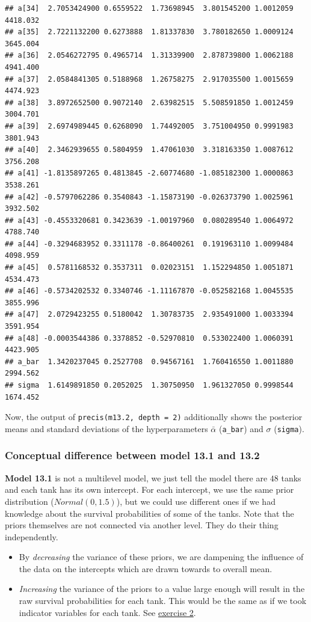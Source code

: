 \documentclass[
]{book}
\begin{document}
\begin{verbatim}
## a[34]  2.7053424900 0.6559522  1.73698945  3.801545200 1.0012059 4418.032
## a[35]  2.7221132200 0.6273888  1.81337830  3.780182650 1.0009124 3645.004
## a[36]  2.0546272795 0.4965714  1.31339900  2.878739800 1.0062188 4941.400
## a[37]  2.0584841305 0.5188968  1.26758275  2.917035500 1.0015659 4474.923
## a[38]  3.8972652500 0.9072140  2.63982515  5.508591850 1.0012459 3004.701
## a[39]  2.6974989445 0.6268090  1.74492005  3.751004950 0.9991983 3801.943
## a[40]  2.3462939655 0.5804959  1.47061030  3.318163350 1.0087612 3756.208
## a[41] -1.8135897265 0.4813845 -2.60774680 -1.085182300 1.0000863 3538.261
## a[42] -0.5797062286 0.3540843 -1.15873190 -0.026373790 1.0025961 3932.502
## a[43] -0.4553320681 0.3423639 -1.00197960  0.080289540 1.0064972 4788.740
## a[44] -0.3294683952 0.3311178 -0.86400261  0.191963110 1.0099484 4098.959
## a[45]  0.5781168532 0.3537311  0.02023151  1.152294850 1.0051871 4534.473
## a[46] -0.5734202532 0.3340746 -1.11167870 -0.052582168 1.0045535 3855.996
## a[47]  2.0729423255 0.5180042  1.30783735  2.935491000 1.0033394 3591.954
## a[48] -0.0003544386 0.3378852 -0.52970810  0.533022400 1.0060391 4423.905
## a_bar  1.3420237045 0.2527708  0.94567161  1.760416550 1.0011880 2994.562
## sigma  1.6149891850 0.2052025  1.30750950  1.961327050 0.9998544 1674.452
\end{verbatim}

Now, the output of \texttt{precis(m13.2,\ depth\ =\ 2)} additionally shows the posterior means
and standard deviations of the hyperparameters \(\bar{\alpha}\) (\texttt{a\_bar})
and \(\sigma\) (\texttt{sigma}).

\subsubsection{Conceptual difference between model 13.1 and 13.2}\label{conceptual-difference-between-model-13.1-and-13.2}

\textbf{Model 13.1} is not a multilevel model, we just tell the model there are
\(48\) tanks and each tank has its own intercept. For each intercept, we use
the same prior distribution (\(Normal (0, 1.5)\)), but we could use different ones if
we had knowledge about the survival probabilities of some of the tanks.
Note that the priors themselves are not connected via another level.
They do their thing independently.

\begin{itemize}
\item
  By \emph{decreasing} the variance of these priors,
  we are dampening the influence of the data on the intercepts
  which are drawn towards to overall mean.
\item
  \emph{Increasing} the variance of the priors
  to a value large enough will result in the raw survival probabilities for each tank.
  This would be the same as if we took indicator variables for each tank.
  See \hyperref[exercise2_LMM]{exercise 2}.
\end{itemize}
\end{document}
